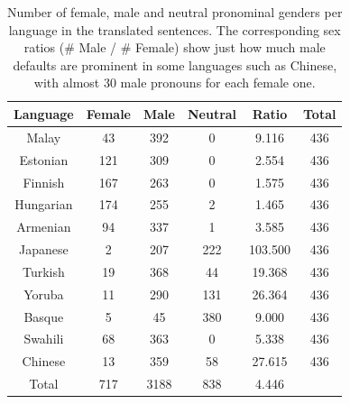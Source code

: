 \documentclass{article}
\begin{document}
\begin{table}[H]
	\centering
	\begin{tabular}{|c|c|c|c|c|c|}
	\hline
	Language & Female & Male & Neutral & Ratio & Total \\ \hline
	\hline
	Malay     & 43     & 392  & 0       & 9.116 	& 436   \\ \hline
	Estonian  & 121    & 309  & 0       & 2.554 	& 436   \\ \hline
	Finnish   & 167    & 263  & 0       & 1.575 	& 436   \\ \hline
	Hungarian & 174    & 255  & 2       & 1.465 	& 436   \\ \hline
	Armenian  & 94     & 337  & 1       & 3.585 	& 436   \\ \hline
	Japanese  & 2      & 207  & 222     & 103.500   & 436   \\ \hline
	Turkish   & 19     & 368  & 44      & 19.368 	& 436   \\ \hline
	Yoruba    & 11     & 290  & 131     & 26.364 	& 436   \\ \hline
	Basque    & 5      & 45   & 380     & 9.000		& 436   \\ \hline
	Swahili   & 68     & 363  & 0       & 5.338 	& 436   \\ \hline
	Chinese   & 13     & 359  & 58      & 27.615 	& 436   \\ \hline
	\hline
	Total 	  & 717    & 3188 & 838     & 4.446     &   \\ \hline
	\end{tabular}
	\label{tab:gender-by-category}
	\caption{Number of female, male and neutral pronominal genders per language in the translated sentences. The corresponding sex ratios (\# Male / \# Female) show just how much male defaults are prominent in some languages such as Chinese, with almost 30 male pronouns for each female one.}
\end{table}
\end{document}
